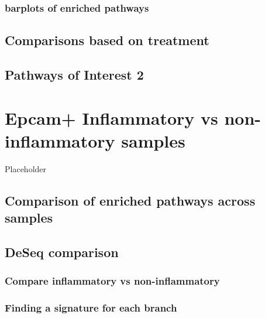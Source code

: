 \documentclass[
]{book}
\begin{document}
\hypertarget{barplots-of-enriched-pathways}{%
\subsection{barplots of enriched pathways}\label{barplots-of-enriched-pathways}}

\hypertarget{comparisons-based-on-treatment}{%
\section{Comparisons based on treatment}\label{comparisons-based-on-treatment}}

\hypertarget{pathways-of-interest-2}{%
\section{Pathways of Interest 2}\label{pathways-of-interest-2}}

\hypertarget{epcam-inflammatory-vs-non-inflammatory-samples}{%
\chapter{Epcam+ Inflammatory vs non-inflammatory samples}\label{epcam-inflammatory-vs-non-inflammatory-samples}}

Placeholder

\hypertarget{comparison-of-enriched-pathways-across-samples}{%
\section{Comparison of enriched pathways across samples}\label{comparison-of-enriched-pathways-across-samples}}

\hypertarget{deseq-comparison}{%
\section{DeSeq comparison}\label{deseq-comparison}}

\hypertarget{compare-inflammatory-vs-non-inflammatory}{%
\subsection{Compare inflammatory vs non-inflammatory}\label{compare-inflammatory-vs-non-inflammatory}}

\hypertarget{finding-a-signature-for-each-branch}{%
\subsection{Finding a signature for each branch}\label{finding-a-signature-for-each-branch}}
\end{document}
